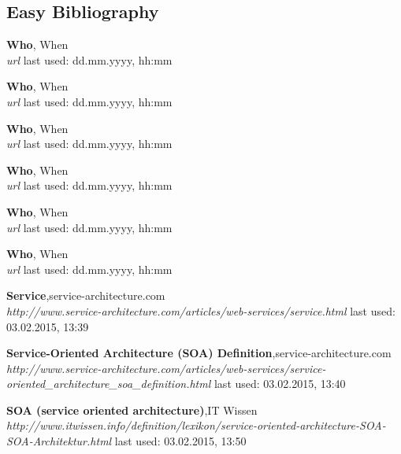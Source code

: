 \documentclass[12pt]{article}
\begin{document}
\subsection{Easy Bibliography}
\begin{thebibliography}{56}

   \textbf{Who}, When\\
  \textit{url}
  \newline last used: dd.mm.yyyy, hh:mm


   \textbf{Who}, When\\
  \textit{url}
  \newline last used: dd.mm.yyyy, hh:mm
 
 
   \textbf{Who}, When\\
  \textit{url}
  \newline last used: dd.mm.yyyy, hh:mm
 
 
   \textbf{Who}, When\\
  \textit{url}
  \newline last used: dd.mm.yyyy, hh:mm
 
 
 
   \textbf{Who}, When\\
  \textit{url}
  \newline last used: dd.mm.yyyy, hh:mm
  
 
   \textbf{Who}, When\\
  \textit{url}
  \newline last used: dd.mm.yyyy, hh:mm
    
  
   
 
   \textbf{Service},service-architecture.com \\
  \textit{http://www.service-architecture.com/articles/web-services/service.html}
  \newline last used: 03.02.2015, 13:39
     
     
   \textbf{Service-Oriented Architecture (SOA) Definition},service-architecture.com \\
  \textit{http://www.service-architecture.com/articles/web-services/service-oriented\_architecture\_soa\_definition.html}
  \newline last used: 03.02.2015, 13:40
     
     
   \textbf{SOA (service oriented architecture)},IT Wissen \\
  \textit{http://www.itwissen.info/definition/lexikon/service-oriented-architecture-SOA-SOA-Architektur.html}
  \newline last used: 03.02.2015, 13:50
     

\end{thebibliography}
\end{document}
